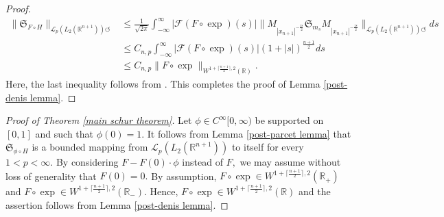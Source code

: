\documentclass[12pt]{amsart}
\begin{document}
\begin{proof}
\begin{align*}
\|\mathfrak{S}_{F\circ H}\|_{\mathcal{L}_p(L_2(\mathbb{R}^{n+1}))\circlearrowleft}
&\leq\frac1{\sqrt{2\pi}}\int_{-\infty}^{\infty}|\mathcal{F}(F\circ\exp)(s)|\big\|M_{|x_{n+1}|^{-\frac{is}{2}}}\mathfrak{S}_{m_s}M_{|x_{n+1}|^{-\frac{is}{2}}}\big\|_{\mathcal{L}_p(L_2(\mathbb{R}^{n+1}))\circlearrowleft}ds\\
&\leq C_{n,p}\int_{-\infty}^{\infty}|\mathcal{F}(F\circ\exp)(s)| (1+|s|)^{\frac{n+1}{2}}ds\\
&\leq C_{n,p}\|F\circ\exp\|_{W^{1+\lceil\frac{n+1}{2}\rceil,2}(\mathbb{R})}.
\end{align*}
Here, the last inequality follows from \cite[Lemma 7]{PS-crelle}. This completes the proof of Lemma \ref{post-denis lemma}.
\end{proof}

\begin{proof}[Proof of Theorem \ref{main schur theorem}] Let $\phi\in C^{\infty}[0,\infty)$ be supported on $[0,1]$ and such that $\phi(0)=1.$ It follows from Lemma \ref{post-parcet lemma} that $\mathfrak{S}_{\phi\circ H}$ is a bounded mapping from $\mathcal{L}_p(L_2(\mathbb{R}^{n+1}))$ to itself for every $1<p<\infty.$ By considering $F-F(0)\cdot\phi$ instead of $F,$ we may assume without loss of generality that $F(0)=0.$ By assumption, $F\circ\exp\in W^{1+\lceil\frac{n+1}{2}\rceil,2}(\mathbb{R}_+)$ and $F\circ\exp\in W^{1+\lceil\frac{n+1}{2}\rceil,2}(\mathbb{R}_-).$ Hence, $F\circ\exp\in W^{1+\lceil\frac{n+1}{2}\rceil,2}(\mathbb{R})$ and the assertion follows from Lemma \ref{post-denis lemma}.
\end{proof}
\end{document}
